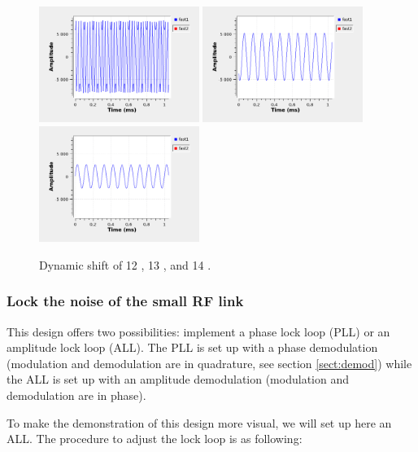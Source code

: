 \documentclass[12pt,oneside]{article}
\begin{document}
\begin{figure}[h!tb]
	\begin{center}
		\vspace{0.5cm}
		\includegraphics[width=5.2cm,trim={0cm 0cm 0cm 0cm}, clip]{figures/12shdyn.png}
		\includegraphics[width=5.2cm,trim={0cm 0cm 0cm 0cm}, clip]{figures/13shdyn.png}
		\includegraphics[width=5.2cm,trim={0cm 0cm 0cm 0cm}, clip]{figures/14shdyn.png}
		\caption{Dynamic shift of 12 {\color{red}}, 13 {\color{OliveGreen}}, and 14 {\color{red}}.}
		\label{fig:shdynadj}
	\end{center}
\end{figure}
\vspace{2cm}


\subsubsection{Lock the noise of the small RF link}

This design offers two possibilities: implement a phase lock loop (PLL) or an amplitude lock loop (ALL). The PLL is set up with a phase demodulation (modulation and demodulation are in quadrature, see section \ref{sect:demod}) while the ALL is set up with an amplitude demodulation (modulation and demodulation are in phase). 

To make the demonstration of this design more visual, we will set up here an ALL. The procedure to adjust the lock loop is as following:
\end{document}
